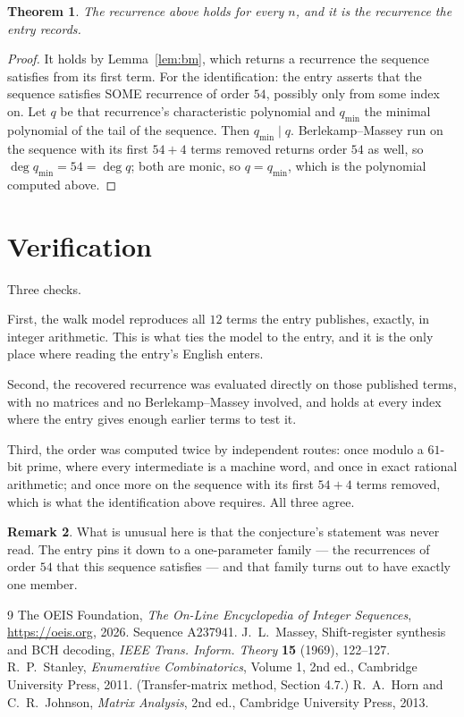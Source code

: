 \documentclass[11pt,a4paper]{article}
\theoremstyle{plain}
\newtheorem{theorem}{Theorem}
\theoremstyle{definition}
\newtheorem{remark}[theorem]{Remark}
\begin{document}
\begin{theorem}
The recurrence above holds for every $n$, and it is the recurrence the entry records.
\end{theorem}

\begin{proof}
It holds by Lemma~\ref{lem:bm}, which returns a recurrence the sequence satisfies from its
first term. For the identification: the entry asserts that the sequence satisfies SOME
recurrence of order $54$, possibly only from some index on. Let $q$ be that recurrence's
characteristic polynomial and $q_{\min}$ the minimal polynomial of the tail of the sequence.
Then $q_{\min}\mid q$. Berlekamp--Massey run on the sequence with its first $54+4$ terms
removed returns order $54$ as well, so $\deg q_{\min}=54=\deg q$; both are monic, so
$q=q_{\min}$, which is the polynomial computed above.
\end{proof}

\section{Verification}

Three checks.

First, the walk model reproduces all $12$ terms the entry publishes, exactly, in integer
arithmetic. This is what ties the model to the entry, and it is the only place where reading
the entry's English enters.

Second, the recovered recurrence was evaluated directly on those published terms, with no
matrices and no Berlekamp--Massey involved, and holds at every index where the entry gives
enough earlier terms to test it.

Third, the order was computed twice by independent routes: once modulo a $61$-bit prime, where
every intermediate is a machine word, and once in exact rational arithmetic; and once more on
the sequence with its first $54+4$ terms removed, which is what the identification above
requires. All three agree.

\begin{remark}
What is unusual here is that the conjecture's statement was never read. The entry pins it down
to a one-parameter family --- the recurrences of order $54$ that this sequence satisfies
--- and that family turns out to have exactly one member.
\end{remark}

\begin{thebibliography}{9}
 The OEIS Foundation, \emph{The On-Line Encyclopedia of Integer
Sequences}, \url{https://oeis.org}, 2026. Sequence A237941.
 J.~L.~Massey, Shift-register synthesis and BCH decoding, \emph{IEEE
Trans. Inform. Theory} \textbf{15} (1969), 122--127.
 R.~P.~Stanley, \emph{Enumerative Combinatorics}, Volume 1, 2nd ed.,
Cambridge University Press, 2011. (Transfer-matrix method, Section 4.7.)
 R.~A.~Horn and C.~R.~Johnson, \emph{Matrix Analysis}, 2nd ed., Cambridge
University Press, 2013.
\end{thebibliography}
\end{document}
